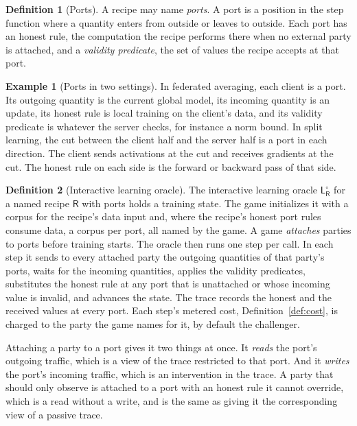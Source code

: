 \documentclass[11pt]{article}
\theoremstyle{definition}
\newtheorem{definition}{Definition}
\newtheorem{example}{Example}
\theoremstyle{plain}
\theoremstyle{remark}
\newcommand{\Lo}{\mathsf{L}}
\newcommand{\Rec}{\mathsf{R}}
\begin{document}
\begin{definition}[Ports]
\label{def:port}
A recipe may name \emph{ports}. A port is a position in the step function where a
quantity enters from outside or leaves to outside. Each port has an honest rule,
the computation the recipe performs there when no external party is attached, and
a \emph{validity predicate}, the set of values the recipe accepts at that port.
\end{definition}

\begin{example}[Ports in two settings]
In federated averaging, each client is a port. Its outgoing quantity is the current
global model, its incoming quantity is an update, its honest rule is local training
on the client's data, and its validity predicate is whatever the server checks,
for instance a norm bound. In split learning, the cut between the client half and
the server half is a port in each direction. The client sends activations at the
cut and receives gradients at the cut. The honest rule on each side is the forward
or backward pass of that side.
\end{example}

\begin{definition}[Interactive learning oracle]
\label{def:interactive}
The interactive learning oracle $\Lo^{\circ}_{\Rec}$ for a named recipe $\Rec$
with ports holds a training state. The game initializes it with a corpus for the
recipe's data input and, where the recipe's honest port rules consume data, a
corpus per port, all named by the game. A game \emph{attaches} parties to ports
before training starts. The oracle then runs one step per call. In each step it
sends to every attached party the outgoing quantities of that party's ports,
waits for the incoming quantities, applies the validity predicates, substitutes
the honest rule at any port that is unattached or whose incoming value is
invalid, and advances the state. The trace records the honest and the received
values at every port. Each step's metered cost, Definition~\ref{def:cost}, is
charged to the party the game names for it, by default the challenger.
\end{definition}

Attaching a party to a port gives it two things at once. It \emph{reads} the port's
outgoing traffic, which is a view of the trace restricted to that port. And it
\emph{writes} the port's incoming traffic, which is an intervention in the trace. A
party that should only observe is attached to a port with an honest rule it cannot
override, which is a read without a write, and is the same as giving it the
corresponding view of a passive trace.
\end{document}
